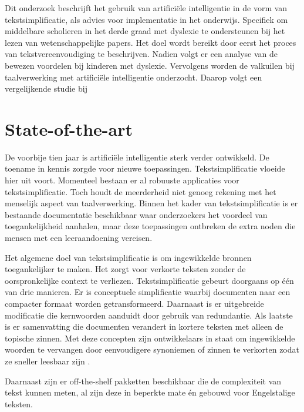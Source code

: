 Dit onderzoek beschrijft het gebruik van artificiële intelligentie in de vorm van tekstsimplificatie, als advies voor implementatie in het onderwijs. Specifiek om middelbare scholieren in het derde graad met dyslexie te ondersteunen bij het lezen van wetenschappelijke papers. Het doel wordt bereikt door eerst het proces van tekstvereenvoudiging te beschrijven. Nadien volgt er een analyse van de bewezen voordelen bij kinderen met dyslexie. Vervolgens worden de valkuilen bij taalverwerking met artificiële intelligentie onderzocht. Daarop volgt een vergelijkende studie bij 


\section{State-of-the-art}%
\label{sec:state-of-the-art}

De voorbije tien jaar is artificiële intelligentie sterk verder ontwikkeld. De toename in kennis zorgde voor nieuwe toepassingen. Tekstsimplificatie vloeide hier uit voort. Momenteel bestaan er al robuuste applicaties voor tekstsimplificatie. Toch houdt de meerderheid niet genoeg rekening met het menselijk aspect van taalverwerking. Binnen het kader van tekstsimplificatie is er bestaande documentatie beschikbaar waar onderzoekers het voordeel van toegankelijkheid aanhalen, maar deze toepassingen ontbreken de extra noden die mensen met een leeraandoening vereisen.

Het algemene doel van tekstsimplificatie is om ingewikkelde bronnen toegankelijker te maken. Het zorgt voor verkorte teksten zonder de oorspronkelijke context te verliezen. Tekstsimplificatie gebeurt doorgaans op één van drie manieren. Er is conceptuele simplificatie waarbij documenten naar een compacter formaat worden getransformeerd. Daarnaast is er uitgebreide modificatie die kernwoorden aanduidt door gebruik van redundantie. Als laatste is er samenvatting die documenten verandert in kortere teksten met alleen de topische zinnen. Met deze concepten zijn ontwikkelaars in staat om ingewikkelde woorden te vervangen door eenvoudigere synoniemen of zinnen te verkorten zodat ze sneller leesbaar zijn \autocite{Siddharthan2014}.

Daarnaast zijn er off-the-shelf pakketten beschikbaar die de complexiteit van tekst kunnen meten, al zijn deze in beperkte mate én gebouwd voor Engelstalige teksten.

